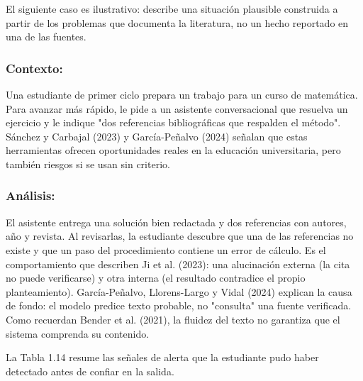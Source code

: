El siguiente caso es ilustrativo: describe una situación plausible construida a partir de los problemas que documenta la literatura, no un hecho reportado en una de las fuentes.

\subsubsection*{Contexto:}
Una estudiante de primer ciclo prepara un trabajo para un curso de matemática. Para avanzar más rápido, le pide a un asistente conversacional que resuelva un ejercicio y le indique "dos referencias bibliográficas que respalden el método". Sánchez y Carbajal (2023) y García-Peñalvo (2024) señalan que estas herramientas ofrecen oportunidades reales en la educación universitaria, pero también riesgos si se usan sin criterio.

\subsubsection*{Análisis:}
El asistente entrega una solución bien redactada y dos referencias con autores, año y revista. Al revisarlas, la estudiante descubre que una de las referencias no existe y que un paso del procedimiento contiene un error de cálculo. Es el comportamiento que describen Ji et al. (2023): una alucinación externa (la cita no puede verificarse) y otra interna (el resultado contradice el propio planteamiento). García-Peñalvo, Llorens-Largo y Vidal (2024) explican la causa de fondo: el modelo predice texto probable, no "consulta" una fuente verificada. Como recuerdan Bender et al. (2021), la fluidez del texto no garantiza que el sistema comprenda su contenido.

La Tabla 1.14 resume las señales de alerta que la estudiante pudo haber detectado antes de confiar en la salida.

